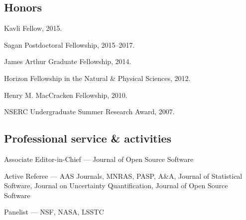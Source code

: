 \documentclass[12pt,letterpaper]{article}
\begin{document}
\subsection{Honors}
\begin{list}{}{\cvlist}

  \item Kavli Fellow, 2015.
  \item Sagan Postdoctoral Fellowship, 2015--2017.
  \item James Arthur Graduate Fellowship, 2014.
  \item Horizon Fellowship in the Natural \& Physical Sciences, 2012.
  \item Henry M. MacCracken Fellowship, 2010.
  \item NSERC Undergraduate Summer Research Award, 2007.

\end{list}


\subsection{Professional service \& activities}
\begin{list}{}{\cvlist}
  \item Associate Editor-in-Chief --- Journal of Open Source Software
  \item Active Referee ---
        AAS Journals,
        MNRAS,
        PASP,
        A\&A,
        Journal of Statistical Software,
        Journal on Uncertainty Quantification,
        Journal of Open Source Software
  \item Panelist ---
        NSF, NASA, LSSTC
\end{list}
\end{document}
